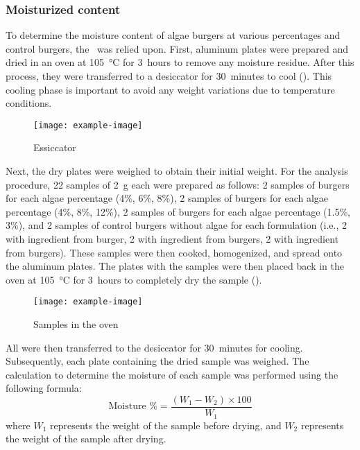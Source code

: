 \subsubsection{Moisturized content}
To determine the moisture content of algae burgers at various percentages and control burgers, the~\cite{aoac_2000}  was relied upon. First, aluminum plates were prepared and dried in an oven at \qty{105}{\degreeCelsius} for \qty{3}{hours} to remove any moisture residue. After this process, they were transferred to a desiccator for \qty{30}{minutes} to cool (). This cooling phase is important to avoid any weight variations due to temperature conditions.

\begin{figure}[H]
	\centering
	\texttt{[image: example-image]}
	\caption[]{Essiccator}
	\label{fig:}
\end{figure}

Next, the dry plates were weighed to obtain their initial weight. For the analysis procedure, 22 samples of \qty{2}{\gram} each were prepared as follows: 2 samples of  burgers for each algae percentage (4\%, 6\%, 8\%), 2 samples of  burgers for each algae percentage (4\%, 8\%, 12\%), 2 samples of  burgers for each algae percentage (1.5\%, 3\%), and 2 samples of control burgers without algae for each formulation (i.e., 2 with ingredient from  burger, 2 with ingredient from  burgers, 2 with ingredient from  burgers). These samples were then cooked, homogenized, and spread onto the aluminum plates. The plates with the samples were then placed back in the oven at \qty{105}{\degreeCelsius} for \qty{3}{hours} to completely dry the sample ().

\begin{figure}[H]
	\centering
	\texttt{[image: example-image]}
	\caption[]{Samples in the oven}
	\label{fig:}
\end{figure}

All were then transferred to the desiccator for \qty{30}{minutes} for cooling. Subsequently, each plate containing the dried sample was weighed. The calculation to determine the moisture of each sample was performed using the following formula:\zariv{}
\[
	\text{Moisture \%} = \frac{(W_1 - W_2) \times 100}{W_1}
\]
where $ W_1 $ represents the weight of the sample before drying, and $ W_2 $ represents the weight of the sample after drying.


